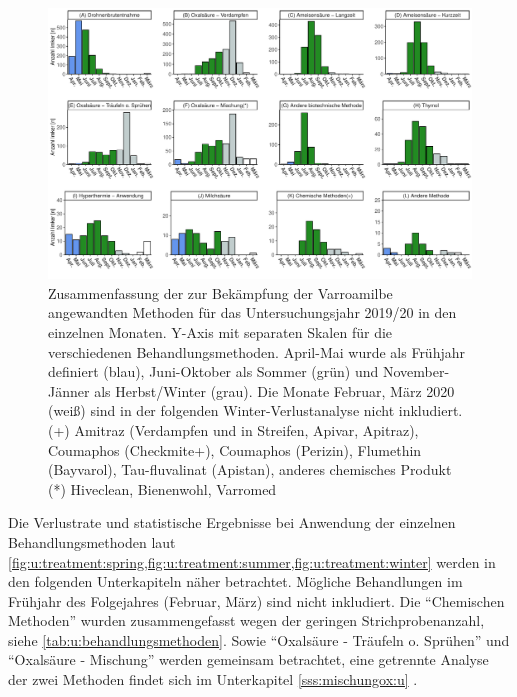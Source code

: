 \begin{figure}[H]
  \centering
  \includegraphics[keepaspectratio,width=1\textwidth]{project-U-wintersterblichkeit/figures/plot_treatment_histogramm}
  \caption{Zusammenfassung der zur Bekämpfung der Varroamilbe angewandten Methoden für das Untersuchungsjahr 2019/20 in den einzelnen Monaten. Y-Axis mit separaten Skalen für die verschiedenen Behandlungsmethoden. April-Mai wurde als Frühjahr definiert (blau), Juni-Oktober als Sommer (grün) und November-Jänner als Herbst/Winter (grau). Die Monate Februar, März 2020 (weiß) sind in der folgenden Winter-Verlustanalyse nicht inkludiert. 
  \newline 
  (+) Amitraz (Verdampfen und in Streifen, Apivar, Apitraz), Coumaphos (Checkmite+), Coumaphos (Perizin), Flumethin (Bayvarol), Tau-fluvalinat (Apistan), anderes chemisches Produkt  
  \newline 
  (*) Hiveclean, Bienenwohl, Varromed}
  \label{fig:u:treatment:histogramm}
\end{figure}


Die Verlustrate und statistische Ergebnisse bei Anwendung der einzelnen Behandlungsmethoden laut \cref{fig:u:treatment:spring,fig:u:treatment:summer,fig:u:treatment:winter} werden in den folgenden Unterkapiteln näher betrachtet. Mögliche Behandlungen im Frühjahr des Folgejahres (Februar, März) sind nicht inkludiert. Die \enquote{Chemischen Methoden} wurden zusammengefasst wegen der geringen Strichprobenanzahl, siehe \cref{tab:u:behandlungsmethoden}. Sowie \enquote{Oxalsäure - Träufeln o. Sprühen} und \enquote{Oxalsäure - Mischung} werden gemeinsam betrachtet, eine getrennte Analyse der zwei Methoden findet sich im Unterkapitel \ref{sss:mischungox:u} .

